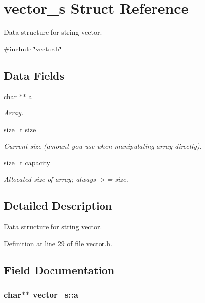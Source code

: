 \hypertarget{structvector__s}{\section{vector\-\_\-s \-Struct \-Reference}
\label{structvector__s}
}


\-Data structure for string vector.  




{\ttfamily \#include \char`\"{}vector.\-h\char`\"{}}

\subsection*{\-Data \-Fields}
\begin{DoxyCompactItemize}
\item 
char $\ast$$\ast$ \hyperlink{structvector__s_a106b319236f6163ae3ae4ae132221607}{a}
\begin{DoxyCompactList}\small\item\em \-Array. \end{DoxyCompactList}\item 
size\-\_\-t \hyperlink{structvector__s_a280d9c8b903f27cff3d8287b391a886f}{size}
\begin{DoxyCompactList}\small\item\em \-Current size (amount you use when manipulating array directly). \end{DoxyCompactList}\item 
size\-\_\-t \hyperlink{structvector__s_ab06dc1a4c166fdc004c02e18eaad09d6}{capacity}
\begin{DoxyCompactList}\small\item\em \-Allocated size of array; always $>$= size. \end{DoxyCompactList}\end{DoxyCompactItemize}


\subsection{\-Detailed \-Description}
\-Data structure for string vector. 



\-Definition at line 29 of file vector.\-h.



\subsection{\-Field \-Documentation}
\hypertarget{structvector__s_a106b319236f6163ae3ae4ae132221607}{
\subsubsection[{a}]{\setlength{\rightskip}{0pt plus 5cm}char$\ast$$\ast$ {\bf vector\-\_\-s\-::a}}}\label{structvector__s_a106b319236f6163ae3ae4ae132221607}


